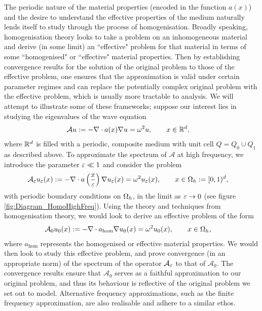 The periodic nature of the material properties (encoded in the function $a(x)$) and the desire to understand the effective properties of the medium naturally lends itself to study through the process of homogenisation.
Broadly speaking, homogenisation theory looks to take a problem on an inhomogeneous material and derive (in some limit) an ``effective" problem for that material in terms of some ``homogenised" or ``effective" material properties.
Then by establishing convergence results for the solution of the original problem to those of the effective problem, one ensures that the approximation is valid under certain parameter regimes and can replace the potentially complex original problem with the effective problem, which is usually more tractable to analysis.
We will attempt to illustrate some of these frameworks; suppose our interest lies in studying the eigenvalues of the wave equation
\begin{align*} 
	\mathcal{A}u &:= -\nabla\cdot a(x)\nabla u = \omega^2 u, \qquad x\in\mathbb{R}^d,
\end{align*}
where $\mathbb{R}^d$ is filled with a periodic, composite medium with unit cell $Q=Q_0\cup Q_1$ as described above.
To approximate the spectrum of $\mathcal{A}$ at high frequency, we introduce the parameter $\varepsilon\ll 1$ and consider the problem
\begin{align} \label{eq:Homo-HighFreqApprox}
	\mathcal{A}_{\varepsilon}u_{\varepsilon}(x) &:= -\nabla\cdot a\left( \frac{x}{\varepsilon} \right)\nabla u_{\varepsilon}(x) = \omega^2 u_{\varepsilon}(x), \qquad x\in\Omega_{h}:=[0,1)^d,
\end{align}
with periodic boundary conditions on $\Omega_h$, in the limit as $\varepsilon\rightarrow0$ (see figure \ref{fig:Diagram_HomoHighFreq}).
Using the theory and techniques from homogenisation theory, we would look to derive an effective problem of the form
\begin{align} \label{eq:Homo-HighFreqApproxEffective}
	\mathcal{A}_0 u_0(x) &:= -\nabla\cdot a_{\mathrm{hom}}\nabla u_0(x) = \omega^2 u_0(x), \qquad x\in\Omega_h,
\end{align} 
where $a_{\mathrm{hom}}$ represents the homogenised or effective material properties.
We would then look to study this effective problem, and prove convergence (in an appropriate norm) of the spectrum of the operator $\mathcal{A}_{\varepsilon}$ to that of $\mathcal{A}_0$.
The convergence results ensure that $\mathcal{A}_0$ serves as a faithful approximation to our original problem, and thus its behaviour is reflective of the original problem we set out to model.
Alternative frequency approximations, such as the finite frequency approximation, are also realisable and adhere to a similar ethos.
